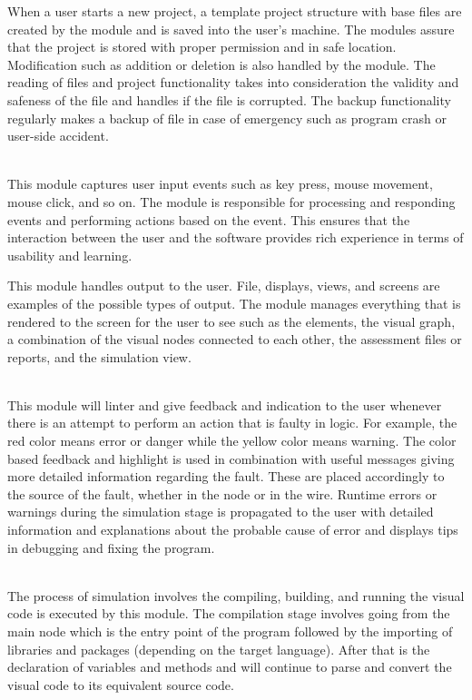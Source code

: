 \parx
When a user starts a new project, a template project structure with base files are
created by the module and is saved into the user's machine. The modules assure that
the project is stored with proper permission and in safe location. Modification such
as addition or deletion is also handled by the module. The reading of files and
project functionality takes into consideration the validity and safeness of the file
and handles if the file is corrupted. The backup functionality regularly makes
a backup of file in case of emergency such as program crash or user-side accident.

\flushleft
\textbf{}\\
\justifying
\parx
This module captures user input events such as key press, mouse movement, mouse
click, and so on. The module is responsible for processing and responding events and
performing actions based on the event. This ensures that the interaction between the
user and the software provides rich experience in terms of usability and learning.

\parx
This module handles output to the user. File, displays, views, and screens are examples
of the possible types of output. The module manages everything that is rendered to the
screen for the user to see such as the elements, the visual graph, a combination of the
visual nodes connected to each other, the assessment files or reports, and the
simulation view.

\flushleft
\textbf{}\\
\justifying
\parx
This module will linter and give feedback and indication to the user whenever there
is an attempt to perform an action that is faulty in logic. For example, the red
color means error or danger while the yellow color means warning. The color based
feedback and highlight is used in combination with useful messages giving more
detailed information regarding the fault. These are placed accordingly to the source
of the fault, whether in the node or in the wire. Runtime errors or warnings during
the simulation stage is propagated to the user with detailed information and
explanations about the probable cause of error and displays tips in debugging and
fixing the program.

\flushleft
\textbf{}\\
\justifying
\parx
The process of simulation involves the compiling, building, and running the visual
code is executed by this module. The compilation stage involves going from the main
node which is the entry point of the program followed by the importing of libraries
and packages (depending on the target language). After that is the declaration of
variables and methods and will continue to parse and convert the visual code to its
equivalent source code.

